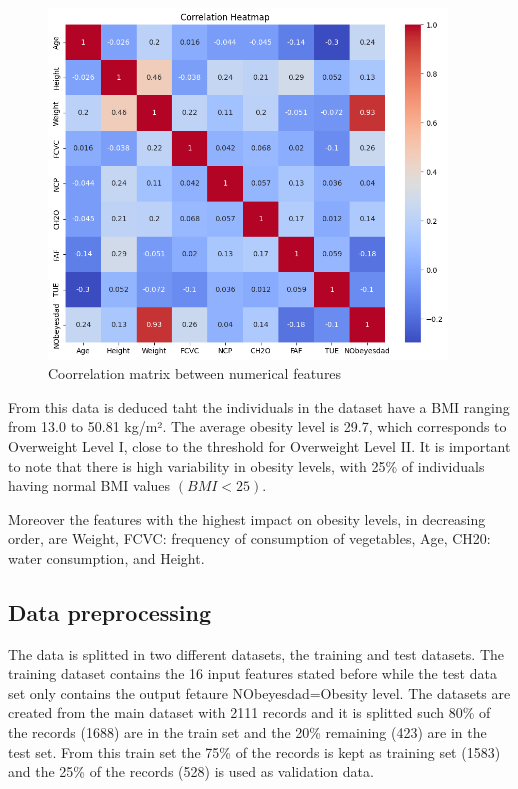 \documentclass[11pt, a4paper]{article}
\begin{document}
\begin{figure}[H]
    \centering
    \includegraphics[width=300pt]{images/correlation_matrix_between_features.png}
    \caption{Coorrelation matrix between numerical features}
    \label{fig:image_correlation_matrix_between_features}
\end{figure}

From this data is deduced taht the individuals in the dataset have a BMI ranging from 13.0 to 50.81 kg/m². The average obesity level is 29.7, 
which corresponds to Overweight Level I, close to the threshold for Overweight Level II. It is important to note that there is high variability 
in obesity levels, with 25\% of individuals having normal BMI values \((BMI < 25)\).

Moreover the features with the highest impact on obesity levels, in decreasing order, are Weight, FCVC: frequency of consumption of vegetables, 
Age, CH20: water consumption, and Height.

\subsection{Data preprocessing}

The data is splitted in two different datasets, the training and test datasets. The training dataset contains the 16 input features stated before 
while the test data set only contains the output fetaure NObeyesdad=Obesity level. The datasets are created from the main dataset with 2111 records 
and it is splitted such 80\% of the records (1688) are in the train set and the 20\% remaining (423) are in the test set. From this train set the 
75\% of the records is kept as training set (1583) and the 25\% of the records (528) is used as validation data.
\end{document}
